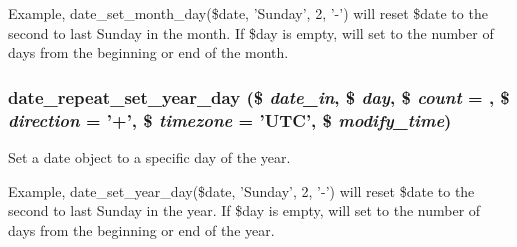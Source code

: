 Example, date\_\-set\_\-month\_\-day(\$date, 'Sunday', 2, '-\/') will reset \$date to the second to last Sunday in the month. If \$day is empty, will set to the number of days from the beginning or end of the month. \hypertarget{date__repeat__calc_8inc_a2feae22de131cda2a56cacbacd5c5dc0}{
\subsubsection[{date\_\-repeat\_\-set\_\-year\_\-day}]{\setlength{\rightskip}{0pt plus 5cm}date\_\-repeat\_\-set\_\-year\_\-day (\$ {\em date\_\-in}, \/  \$ {\em day}, \/  \$ {\em count} = {}, \/  \$ {\em direction} = {\ttfamily '+'}, \/  \$ {\em timezone} = {\ttfamily 'UTC'}, \/  \$ {\em modify\_\-time})}}
\label{date__repeat__calc_8inc_a2feae22de131cda2a56cacbacd5c5dc0}
Set a date object to a specific day of the year.

Example, date\_\-set\_\-year\_\-day(\$date, 'Sunday', 2, '-\/') will reset \$date to the second to last Sunday in the year. If \$day is empty, will set to the number of days from the beginning or end of the year. 